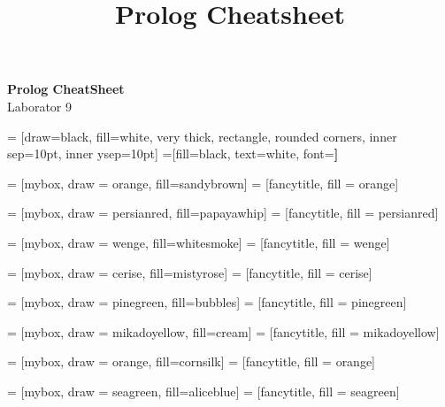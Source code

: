 \documentclass[a3paper]{article}
\title{Prolog Cheatsheet}
\begin{document}
\begin{center}{\huge{\textbf{Prolog CheatSheet}}}\\
{\large Laborator 9}
\end{center}

\begin{multicols*}{3}

 = [draw=black, fill=white, very thick,
    rectangle, rounded corners, inner sep=10pt, inner ysep=10pt]
 =[fill=black, text=white, font=\bfseries]

 = [mybox, draw = orange, fill=sandybrown]
 = [fancytitle, fill = orange]


 = [mybox, draw = persianred, fill=papayawhip]
 = [fancytitle, fill = persianred]

 = [mybox, draw = wenge, fill=whitesmoke]
 = [fancytitle, fill = wenge]

 = [mybox, draw = cerise, fill=mistyrose]
 = [fancytitle, fill = cerise]

 = [mybox, draw = pinegreen, fill=bubbles]
 = [fancytitle, fill = pinegreen]

 = [mybox, draw = mikadoyellow, fill=cream]
 = [fancytitle, fill = mikadoyellow]

 = [mybox, draw = orange, fill=cornsilk]
 = [fancytitle, fill = orange]

 = [mybox, draw = seagreen, fill=aliceblue]
 = [fancytitle, fill = seagreen]


\end{multicols*}
\end{document}
